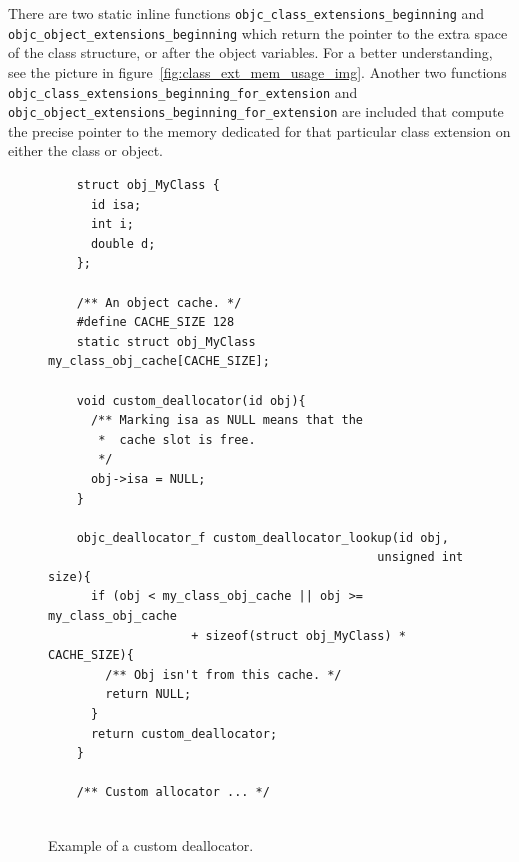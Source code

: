 There are two static inline functions \texttt{objc\_class\_extensions\_beginning} \newline{}and \texttt{objc\_object\_extensions\_beginning} which return the pointer to the extra space of the class structure, or after the object variables. For a better understanding, see the picture in figure~\ref{fig:class_ext_mem_usage_img}. Another two functions \newline{}\texttt{objc\_class\_extensions\_beginning\_for\_extension} and \newline{}\texttt{objc\_object\_extensions\_beginning\_for\_extension} are included that compute the precise pointer to the memory dedicated for that particular class extension on either the class or object.


\begin{figure}[htbp] 
  \begin{verbatim}
    struct obj_MyClass {
      id isa;
      int i;
      double d;
    };
    
    /** An object cache. */
    #define CACHE_SIZE 128
    static struct obj_MyClass my_class_obj_cache[CACHE_SIZE];
    
    void custom_deallocator(id obj){
      /** Marking isa as NULL means that the
       *  cache slot is free.
       */
      obj->isa = NULL;
    }
    
    objc_deallocator_f custom_deallocator_lookup(id obj, 
                                              unsigned int size){
      if (obj < my_class_obj_cache || obj >= my_class_obj_cache 
                    + sizeof(struct obj_MyClass) * CACHE_SIZE){
        /** Obj isn't from this cache. */
        return NULL;
      }
      return custom_deallocator;
    }
    
    /** Custom allocator ... */
    
  \end{verbatim}
  \centering{}
  \caption{Example of a custom deallocator.}
  \label{fig:class_ext_dealloc_example}
\end{figure}

